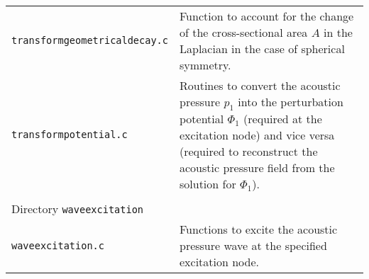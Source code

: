 \begin{longtable}{p{} p{}}
{\tt transformgeometricaldecay.c} & Function to account for the change of the cross-sectional area $A$ in the Laplacian in the case of spherical symmetry. \\
{\tt transformpotential.c} & Routines to convert the acoustic pressure $p_1$ into the perturbation potential $\Phi_1$ (required at the excitation node) and vice versa (required to reconstruct the acoustic pressure field from the solution for $\Phi_1$). \\
\\
\hline Directory {\tt waveexcitation} &\\ \hline
{\tt waveexcitation.c} & Functions to excite the acoustic pressure wave at the specified excitation node. \\
 \hline
\end{longtable} \vspace{1em}

